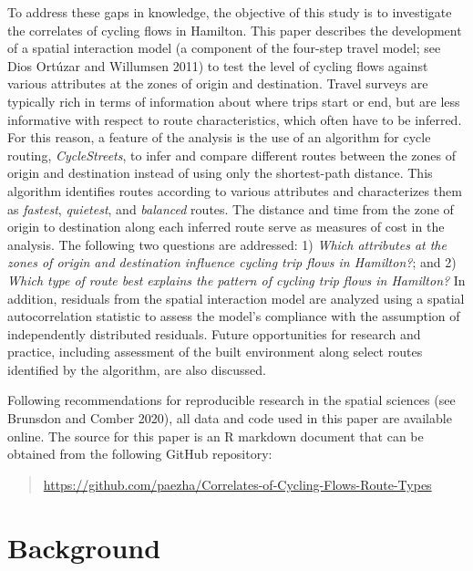 \documentclass[smallextended]{svjour3}       %
\begin{document}
To address these gaps in knowledge, the objective of this study is to
investigate the correlates of cycling flows in Hamilton. This paper
describes the development of a spatial interaction model (a component of
the four-step travel model; see Dios Ortúzar and Willumsen 2011) to test
the level of cycling flows against various attributes at the zones of
origin and destination. Travel surveys are typically rich in terms of
information about where trips start or end, but are less informative
with respect to route characteristics, which often have to be inferred.
For this reason, a feature of the analysis is the use of an algorithm
for cycle routing, \emph{CycleStreets}, to infer and compare different
routes between the zones of origin and destination instead of using only
the shortest-path distance. This algorithm identifies routes according
to various attributes and characterizes them as \emph{fastest},
\emph{quietest}, and \emph{balanced} routes. The distance and time from
the zone of origin to destination along each inferred route serve as
measures of cost in the analysis. The following two questions are
addressed: 1) \emph{Which attributes at the zones of origin and
destination influence cycling trip flows in Hamilton?}; and 2)
\emph{Which type of route best explains the pattern of cycling trip
flows in Hamilton?} In addition, residuals from the spatial interaction
model are analyzed using a spatial autocorrelation statistic to assess
the model's compliance with the assumption of independently distributed
residuals. Future opportunities for research and practice, including
assessment of the built environment along select routes identified by
the algorithm, are also discussed.

Following recommendations for reproducible research in the spatial
sciences (see Brunsdon and Comber 2020), all data and code used in this
paper are available online. The source for this paper is an R markdown
document that can be obtained from the following GitHub repository:

\begin{quote}
\url{https://github.com/paezha/Correlates-of-Cycling-Flows-Route-Types}
\end{quote}

\hypertarget{sec:background}{%
\section{Background}\label{sec:background}}
\end{document}
